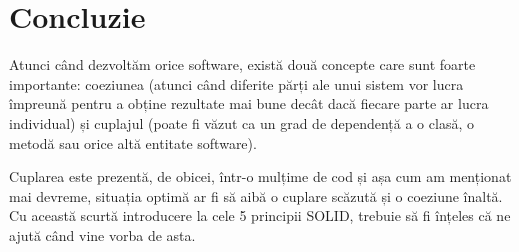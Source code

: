 \section*{Concluzie}


Atunci când dezvoltăm orice software, există două concepte care sunt foarte importante: coeziunea (atunci când diferite părți ale unui sistem vor lucra împreună pentru a obține rezultate mai bune decât dacă fiecare parte ar lucra individual) și cuplajul (poate fi văzut ca un grad de dependență a o clasă, o metodă sau orice altă entitate software).

Cuplarea este prezentă, de obicei, într-o mulțime de cod și așa cum am menționat mai devreme, situația optimă ar fi să aibă o cuplare scăzută și o coeziune înaltă. Cu această scurtă introducere la cele 5 principii SOLID, trebuie să fi înțeles că ne ajută când vine vorba de asta.


\clearpage